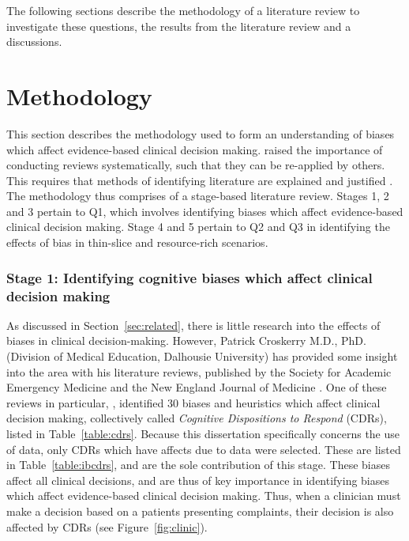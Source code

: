 \documentclass[a4paper]{scrartcl}     %
\newif\ifbreaksection
\begin{document}
  The following sections describe the methodology of a literature review to investigate these questions, the results from the literature review and a discussions.


\ifbreaksection\clearpage\fi\section{Methodology} %

  This section describes the methodology used to form an understanding of biases which affect evidence-based clinical decision making. \citet{Fink2005} raised the importance of conducting reviews systematically, such that they can be re-applied by others. This requires that methods of identifying literature are explained and justified \citep{Fink2005}. The methodology thus comprises of a stage-based literature review. Stages 1, 2 and 3 pertain to Q1, which involves identifying biases which affect evidence-based clinical decision making. Stage 4 and 5 pertain to Q2 and Q3 in identifying the effects of bias in thin-slice and resource-rich scenarios.




  \subsubsection*{Stage 1: Identifying cognitive biases which affect clinical decision making}

    As discussed in Section~\ref{sec:related}, there is little research into the effects of biases in clinical decision-making. However, Patrick Croskerry M.D., PhD. (Division of Medical Education, Dalhousie University) has provided some insight into the area with his literature reviews, published by the Society for Academic Emergency Medicine and the New England Journal of Medicine \citep{Croskerry2002,Croskerry2003,Croskerry2013}. One of these reviews in particular, \citet{Croskerry2002}, identified 30 biases and heuristics which affect clinical decision making, collectively called \textit{Cognitive Dispositions to Respond} (CDRs), listed in Table~\ref{table:cdrs}. Because this dissertation specifically concerns the use of data, only CDRs which have affects due to data were selected. These are listed in Table~\ref{table:ibcdrs}, and are the sole contribution of this stage. These biases affect all clinical decisions, and are thus of key importance in identifying biases which affect evidence-based clinical decision making. Thus, when a clinician must make a decision based on a patients presenting complaints, their decision is also affected by CDRs (see Figure~\ref{fig:clinic}).
\end{document}
